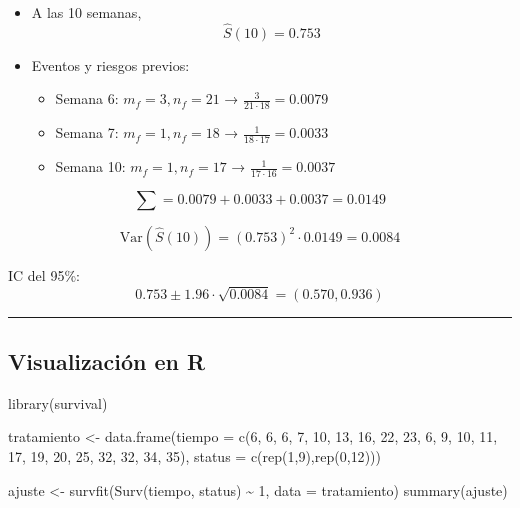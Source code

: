 \documentclass[
]{article}
\newenvironment{Shaded}{\begin{snugshade}}{\end{snugshade}}
\newcommand{\AttributeTok}[1]{\textcolor[rgb]{0.40,0.45,0.13}{#1}}
\newcommand{\DecValTok}[1]{\textcolor[rgb]{0.68,0.00,0.00}{#1}}
\newcommand{\FunctionTok}[1]{\textcolor[rgb]{0.28,0.35,0.67}{#1}}
\newcommand{\NormalTok}[1]{\textcolor[rgb]{0.00,0.23,0.31}{#1}}
\newcommand{\OtherTok}[1]{\textcolor[rgb]{0.00,0.23,0.31}{#1}}
\newcommand{\SpecialCharTok}[1]{\textcolor[rgb]{0.37,0.37,0.37}{#1}}
\providecommand{\tightlist}{%
  \setlength{\itemsep}{0pt}\setlength{\parskip}{0pt}}
\begin{document}
\begin{itemize}
\tightlist
\item
  A las 10 semanas, \[\hat{S}(10) = 0.753\]
\item
  Eventos y riesgos previos:

  \begin{itemize}
  \tightlist
  \item
    Semana 6: \(m_f = 3, n_f = 21\) → \(\frac{3}{21 \cdot 18} = 0.0079\)
  \item
    Semana 7: \(m_f = 1, n_f = 18\) → \(\frac{1}{18 \cdot 17} = 0.0033\)
  \item
    Semana 10: \(m_f = 1, n_f = 17\) →
    \(\frac{1}{17 \cdot 16} = 0.0037\)
  \end{itemize}
\end{itemize}

\[
\sum = 0.0079+0.0033+0.0037=0.0149
\]

\[
\text{Var}(\hat{S}(10)) = (0.753)^2 \cdot 0.0149=0.0084
\]

IC del 95\%: \[
0.753 \pm 1.96 \cdot \sqrt{0.0084} = (0.570, 0.936)
\]

\begin{center}\rule{0.5\linewidth}{0.5pt}\end{center}

\subsection{Visualización en R}\label{visualizaciuxf3n-en-r}

\begin{Shaded}
\begin{Highlighting}[]
\FunctionTok{library}\NormalTok{(survival)}

\NormalTok{tratamiento }\OtherTok{\textless{}{-}} \FunctionTok{data.frame}\NormalTok{(}\AttributeTok{tiempo =} \FunctionTok{c}\NormalTok{(}\DecValTok{6}\NormalTok{, }\DecValTok{6}\NormalTok{, }\DecValTok{6}\NormalTok{, }\DecValTok{7}\NormalTok{, }\DecValTok{10}\NormalTok{, }\DecValTok{13}\NormalTok{, }\DecValTok{16}\NormalTok{, }\DecValTok{22}\NormalTok{, }\DecValTok{23}\NormalTok{, }
                               \DecValTok{6}\NormalTok{, }\DecValTok{9}\NormalTok{, }\DecValTok{10}\NormalTok{, }\DecValTok{11}\NormalTok{, }\DecValTok{17}\NormalTok{, }\DecValTok{19}\NormalTok{, }\DecValTok{20}\NormalTok{, }\DecValTok{25}\NormalTok{, }\DecValTok{32}\NormalTok{, }\DecValTok{32}\NormalTok{, }\DecValTok{34}\NormalTok{, }\DecValTok{35}\NormalTok{),}
                    \AttributeTok{status =} \FunctionTok{c}\NormalTok{(}\FunctionTok{rep}\NormalTok{(}\DecValTok{1}\NormalTok{,}\DecValTok{9}\NormalTok{),}\FunctionTok{rep}\NormalTok{(}\DecValTok{0}\NormalTok{,}\DecValTok{12}\NormalTok{)))}


\NormalTok{ajuste }\OtherTok{\textless{}{-}} \FunctionTok{survfit}\NormalTok{(}\FunctionTok{Surv}\NormalTok{(tiempo, status) }\SpecialCharTok{\textasciitilde{}} \DecValTok{1}\NormalTok{, }\AttributeTok{data =}\NormalTok{ tratamiento)}
\FunctionTok{summary}\NormalTok{(ajuste)}
\end{Highlighting}
\end{Shaded}
\end{document}
